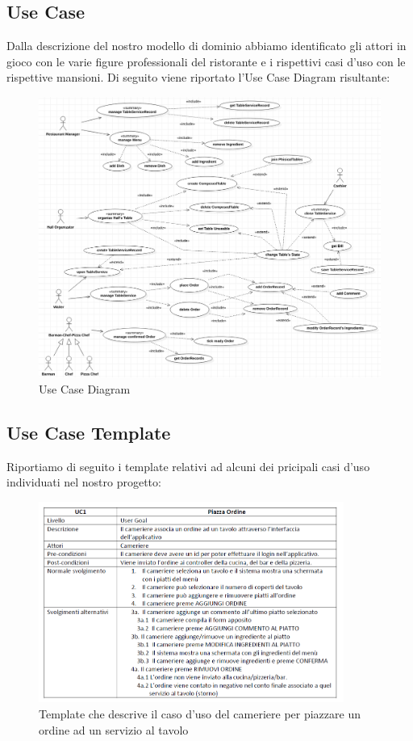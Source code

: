 \documentclass{article}
\begin{document}
\subsection{Use Case}

Dalla descrizione del nostro modello di dominio abbiamo identificato gli attori in gioco con le varie figure professionali del ristorante e i rispettivi casi d'uso con le rispettive mansioni. Di seguito viene riportato l'Use Case Diagram risultante:

\begin{figure}[!h]
\centering
\includegraphics[width= 15cm]{"Immagini/UseCaseDiagram.PNG"}
\caption{Use Case Diagram}
\end{figure}

\newpage

\subsection{Use Case Template}
Riportiamo di seguito i template relativi ad alcuni dei pricipali casi d'uso individuati nel nostro progetto:

\begin{figure}[!h]
\centering
\includegraphics[width= 10cm]{"Immagini/PlaceOrder.PNG"}
\caption{Template che descrive il caso d'uso del cameriere per piazzare un ordine ad un servizio al tavolo}
\end{figure}
\end{document}
